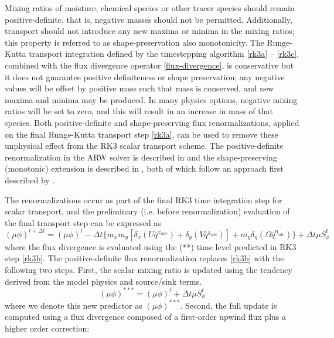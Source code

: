 Mixing ratios of moisture, chemical species or other tracer species
should remain positive-definite, that is, negative masses should not be
permitted.  Additionally, transport should not introduce any new maxima or minima 
in the mixing ratios; this property is referred to as shape-preservation also monotonicity.
The Runge-Kutta transport integration defined by the
timestepping algorithm \eqref{rk3a} -- \eqref{rk3c}, combined with the
flux divergence operator \eqref{flux-divergence}, is conservative but it
does not guarantee positive definiteness or shape preservation; any negative values will be
offset by positive mass such that mass is conserved, and new maxima and minima may be produced.  In many physics
options, negative mixing ratios will be set to zero, and this will
result in an increase in mass of that species.  Both positive-definite and shape-preserving flux
renormalizations, applied on the final Runge-Kutta transport step
\eqref{rk3a}, can be used to remove these unphysical effect from the RK3
scalar transport scheme.  The positive-definite renormalization in the ARW solver is described in 
\citet{skamarock-weisman-08} and the shape-preserving (monotonic) extension is described in \citet{Wang-et-al-2009}, 
both of which follow an approach first described by \citet{Zalesak-1979}.

The renormalizations occur as part of the final RK3 time integration step for scalar transport, and the preliminary
(i.e. before renormalization) evaluation of the final transport step can be
expressed as
%
\begin{equation}
(\mu\phi)^{t+\Delta t} = (\mu\phi)^{t} - {\Delta t}\bigl\{
m_x m_y [\delta_x (U \overline{q}^{x_{adv}}) 
+ \delta_y (V\overline{q}^{y_{adv}})] 
+ m_y \delta_\eta
(\Omega \overline{q}^{\eta_{adv}})\bigr\}
+ \Delta t \mu S_\phi^t
\label{rk3c-scalar}
\end{equation}
%
\noindent
where the flux divergence is evaluated using the (**) time level
predicted in RK3 step \eqref{rk3b}.  The positive-definite flux
renormalization replaces \eqref{rk3b} with the following two steps.  First,
the scalar mixing ratio is updated using the tendency derived from the
model physics and source/sink terms.
%
\begin{equation}
(\mu\phi)^{***} = (\mu\phi)^{t} + {\Delta t} \mu S_\phi^t
\label{scalar-source-update}
\end{equation}
%
where we denote this new predictor as $(\mu\phi)^{***}$.  Second, the
full update is computed using a
flux divergence composed of a first-order upwind flux plus a
higher order correction:

